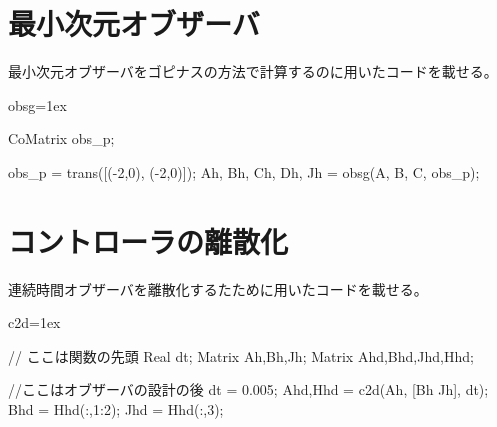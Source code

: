 \section{最小次元オブザーバ}
	最小次元オブザーバをゴピナスの方法で計算するのに用いたコードを載せる。
	\begin{itembox}[l]{obsg}\baselineskip=1ex
		\begin{verbatimtab}[4]
CoMatrix obs_p;

obs_p = trans([(-2,0), (-2,0)]);
{Ah, Bh, Ch, Dh, Jh} = obsg(A, B, C, obs_p);
		\end{verbatimtab}
	\end{itembox}
\section{コントローラの離散化}
	連続時間オブザーバを離散化するたために用いたコードを載せる。
	\begin{itembox}[l]{c2d}\baselineskip=1ex
		\begin{verbatimtab}[4]
// ここは関数の先頭
Real dt;
Matrix Ah,Bh,Jh;
Matrix Ahd,Bhd,Jhd,Hhd;

//ここはオブザーバの設計の後
dt = 0.005;
{Ahd,Hhd} = c2d(Ah, [Bh Jh], dt);
Bhd = Hhd(:,1:2);
Jhd = Hhd(:,3);
		\end{verbatimtab}
	\end{itembox}
